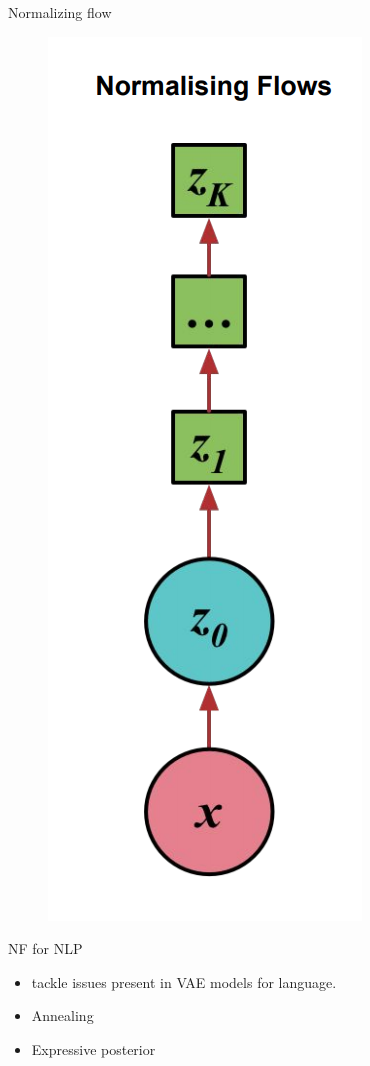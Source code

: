\begin{frame}{Normalizing flow}
\begin{figure}
\includegraphics[scale=0.35]{NF}
\end{figure}
\end{frame}

\begin{frame}{NF for NLP}
\begin{itemize}
\item \citep{effective2019pelsmaeker} tackle issues present in VAE models for language.
\item Annealing
\item Expressive posterior
\end{itemize}
\end{frame}

